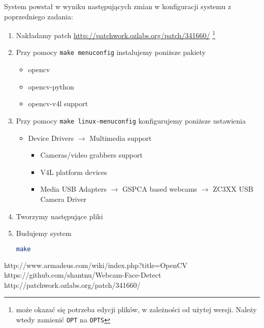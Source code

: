System powstał w wyniku następujących zmian w konfiguracji systemu z poprzedniego zadania:
\begin{enumerate}
	\item Nakładamy patch \url{http://patchwork.ozlabs.org/patch/341660/} \footnote{ może okazać się potrzeba edycji plików, 
	w zależności od użytej wersji. Należy wtedy zamienić \texttt{OPT} na \texttt{OPTS}}
	\item Przy pomocy \texttt{make menuconfig} instalujemy poniższe pakiety
	\begin{itemize}
		\item opencv
		\item opencv-python
		\item opencv-v4l support
	\end{itemize}
	\item Przy pomocy \texttt{make linux-menuconfig}
	konfigurujemy poniższe ustawienia\\
	\begin{itemize}	
		\item Device Drivers $\rightarrow$ Multimedia support
		\begin{itemize}
			\item Cameras/video grabbers support
			\item V4L platform devices
			\item Media USB Adapters $\rightarrow$ GSPCA based webcams $\rightarrow$  ZC3XX USB Camera Driver
		\end{itemize}
	\end{itemize}
	\item Tworzymy następujące pliki	
	
		
	\item Budujemy system
	\begin{lstlisting}[language=bash]
	make
	\end{lstlisting}	
\end{enumerate}

\begin{thebibliography}{4}
 http://www.armadeus.com/wiki/index.php?title=OpenCV
 https://github.com/shantnu/Webcam-Face-Detect
 http://patchwork.ozlabs.org/patch/341660/
\end{thebibliography}


